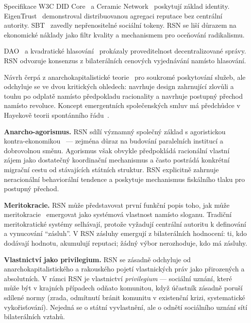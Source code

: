 \documentclass[11pt,a4paper,twocolumn]{article}
\begin{document}
Specifikace W3C DID Core~\cite{did2022} a Ceramic Network~\cite{ceramic2023} poskytují základ identity. EigenTrust~\cite{kamvar2003} demonstroval distribuovanou agregaci reputace bez centrální autority. SBT~\cite{weyl2022} zavedly nepřenositelné sociální tokeny. RSN se liší důrazem na ekonomické náklady jako filtr kvality a mechanismem pro oceňování radikalismu.

DAO~\cite{buterin2014} a kvadratické hlasování~\cite{buterin2019} prokázaly proveditelnost decentralizované správy. RSN odvozuje konsenzus z bilaterálních cenových vyjednávání namísto hlasování.

Návrh čerpá z anarchokapitalistické teorie~\cite{rothbard1973,hoppe2001} pro soukromé poskytování služeb, ale odchyluje se ve dvou kritických ohledech: navrhuje design zahrnující zlovůli a touhu po odplatě namísto předpokladu racionality a navrhuje postupný přechod namísto revoluce. Koncept emergentních společenských smluv má předchůdce v Hayekově teorii spontánního řádu~\cite{hayek1973}.

\textbf{Anarcho-agorismus.} RSN sdílí významný společný základ s agoristickou kontra-ekonomikou~\cite{konkin2006} --- zejména důraz na budování paralelních institucí a dobrovolnou směnu. Agorismus však obvykle předpokládá racionální vlastní zájem jako dostatečný koordinační mechanismus a často postrádá konkrétní migrační cestu od stávajících státních struktur. RSN explicitně zahrnuje neracionální behaviorální tendence a poskytuje mechanismus fiskálního tlaku pro postupný přechod.

\textbf{Meritokracie.} RSN může představovat první funkční popis toho, jak může meritokracie~\cite{young1958} emergovat jako systémová vlastnost namísto sloganu. Tradiční meritokratické systémy selhávají, protože vyžadují centrální autoritu k definování a vynucování ``zásluh''. V RSN zásluhy emergují z bilaterálních hodnocení: ti, kdo dodávají hodnotu, akumulují reputaci; žádný výbor nerozhoduje, kdo má zásluhy.

\textbf{Vlastnictví jako privilegium.} RSN se zásadně odchyluje od anarchokapitalistického a rakouského pojetí vlastnických práv jako přirozených a absolutních. V rámci RSN je vlastnictví \emph{privilegium} --- sociální uznání, které může být v krajních případech odňato komunitou, když účastník zásadně poruší sdílené normy (zrada, odmítnutí bránit komunitu v existenční krizi, systematické vykořisťování). Nejedná se o státní vyvlastnění, ale o odnětí sociálního uznání sítí bilaterálních vztahů.

\end{document}
